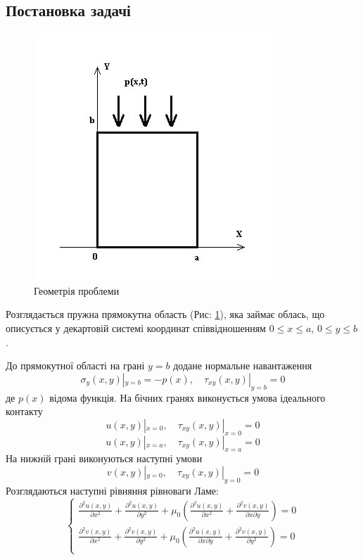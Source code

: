 

\subsection{Постановка задачі}
\begin{figure}[h]
    \begin{center}
        \includegraphics[scale=1]{images/geometry/image_2.jpg}
    \end{center}
    \caption{Геометрія проблеми}\label{geom_static_1}
\end{figure}
Розглядається пружна прямокутна область (Рис: \ref{geom_static_1}), яка займає облась,
що описується у декартовій системі координат співвідношенням $0 \le x \le a$, $0 \le y \le b$.

До прямокутної області на грані $y=b$ додане нормальне навантаження
\begin{equation}
    \sigma_y(x, y) |_{y=b} = -p(x), \quad  \tau_{xy}(x,y) |_{y=b} =0
\end{equation}
де $p(x)$ відома функція.
На бічних гранях виконується умова ідеального контакту
\begin{equation}\label{bound_1_static_1}
    u(x,y) |_{x=0}, \quad \tau_{xy}(x,y) |_{x=0} =0
\end{equation}
\begin{equation}\label{bound_2_static_1}
    u(x,y) |_{x=a}, \quad \tau_{xy}(x,y) |_{x=a} =0
\end{equation}
На нижній грані виконуються наступні умови
\begin{equation}
    v(x,y) |_{y=0}, \quad \tau_{xy}(x,y) |_{y=0} =0
\end{equation}
Розглядаються наступні рівняння рівноваги Ламе:
\begin{equation}\label{lame_static_1}
    \begin{cases}
        \frac{\partial^2 u(x,y)}{\partial x^2} + \frac{\partial^2 u(x,y)}{\partial y^2} + \mu_0 (\frac{\partial^2 u(x,y)}{\partial x^2} + \frac{\partial^2 v(x,y)}{\partial x\partial y}) = 0 \\
        \frac{\partial^2 v(x,y)}{\partial x^2} + \frac{\partial^2 v(x,y)}{\partial y^2} + \mu_0 (\frac{\partial^2 u(x,y)}{\partial x \partial y} + \frac{\partial^2 v(x,y)}{\partial y^2}) = 0 \\
    \end{cases}
\end{equation}

